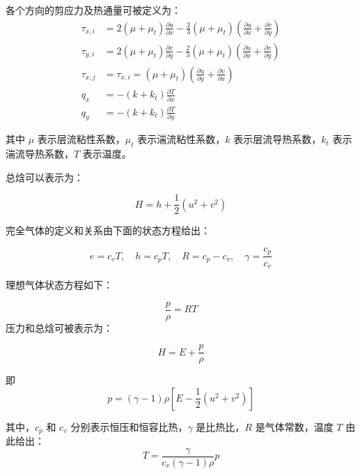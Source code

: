 各个方向的剪应力及热通量可被定义为：
\begin{align}
\tau_{x,i} &= 2(\mu + \mu_t) \frac{\partial u}{\partial x} - \frac{2}{3} (\mu + \mu_t) \left( \frac{\partial u}{\partial x} + \frac{\partial v}{\partial y} \right) \tag{4-7} \\
\tau_{y,i} &= 2(\mu + \mu_t) \frac{\partial v}{\partial y} - \frac{2}{3} (\mu + \mu_t) \left( \frac{\partial u}{\partial x} + \frac{\partial v}{\partial y} \right) \\
\tau_{x,j} &= \tau_{x,i} = (\mu + \mu_t) \left( \frac{\partial u}{\partial y} + \frac{\partial v}{\partial x} \right) \tag{4-7} \\
q_x &= -(k + k_t) \frac{\partial T}{\partial x} \\
q_y &= -(k + k_t) \frac{\partial T}{\partial y}
\end{align}

其中 \(\mu\) 表示层流粘性系数，\(\mu_t\) 表示湍流粘性系数，\(k\) 表示层流导热系数，\(k_t\) 表示湍流导热系数，\(T\) 表示温度。

总焓可以表示为：

\begin{equation}
H = h + \frac{1}{2}(u^2 + v^2) \tag{4-8}
\end{equation}

完全气体的定义和关系由下面的状态方程给出：

\begin{equation}
e = c_v T, \quad h = c_p T, \quad R = c_p - c_v, \quad \gamma = \frac{c_p}{c_v} \tag{4-9}
\end{equation}

理想气体状态方程如下：

\begin{equation}
\frac{p}{\rho} = RT \tag{4-10}
\end{equation}
压力和总焓可被表示为：

\begin{equation}
H = E + \frac{p}{\rho} \tag{4-11}
\end{equation}

即
\begin{equation}
p = (\gamma - 1) \rho \left[ E - \frac{1}{2}(u^2 + v^2) \right] \tag{4-12}
\end{equation}

其中，\(c_p\) 和 \(c_v\) 分别表示恒压和恒容比热，\(\gamma\) 是比热比，\(R\) 是气体常数，温度 \(T\) 由此给出：
\begin{equation}
T = \frac{\gamma}{c_v (\gamma - 1) \rho} p \tag{4-13}
\end{equation}


